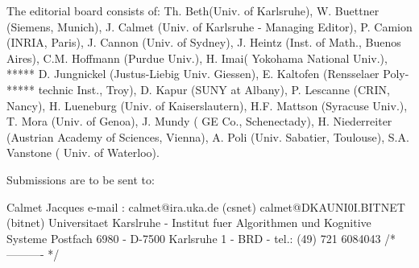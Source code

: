 The editorial board consists of:
Th. Beth(Univ. of Karlsruhe), W. Buettner (Siemens, Munich),
J. Calmet (Univ. of Karlsruhe - Managing Editor), P. Camion (INRIA, Paris),
J. Cannon (Univ. of Sydney), J. Heintz (Inst. of Math., Buenos Aires),
C.M. Hoffmann (Purdue Univ.), H. Imai( Yokohama National Univ.),		   *****
D. Jungnickel (Justus-Liebig Univ. Giessen), E. Kaltofen (Rensselaer Poly-	   *****
technic Inst., Troy), D. Kapur (SUNY at Albany), P. Lescanne (CRIN, Nancy),
H. Lueneburg (Univ. of Kaiserslautern), H.F. Mattson (Syracuse Univ.),
T. Mora (Univ. of Genoa), J. Mundy ( GE Co., Schenectady),
H. Niederreiter (Austrian Academy of Sciences, Vienna), A. Poli (Univ. Sabatier,
Toulouse), S.A. Vanstone ( Univ. of Waterloo).

Submissions are to be sent to:

Calmet Jacques
e-mail : calmet@ira.uka.de  (csnet)      calmet@DKAUNI0I.BITNET (bitnet)
Universitaet Karslruhe - Institut fuer Algorithmen und Kognitive Systeme
Postfach 6980  -  D-7500 Karlsruhe 1  -  BRD  -   tel.: (49) 721 6084043
/* ---------- */


